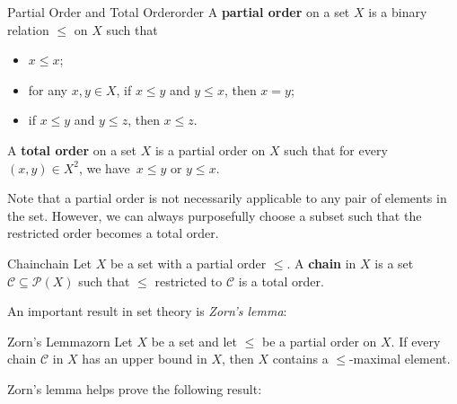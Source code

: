 \documentclass[math]{amznotes}
\theoremstyle{remark}
\begin{document}
\begin{dfnbox}{Partial Order and Total Order}{order}
    A {\color{red} \textbf{partial order}} on a set $X$ is a binary relation $\leq$ on $X$ such that 
    \begin{itemize}
        \item $x \leq x$;
        \item for any $x, y \in X$, if $x \leq y$ and $y \leq x$, then $x = y$;
        \item if $x \leq y$ and $y \leq z$, then $x \leq z$.
    \end{itemize}
    A {\color{red} \textbf{total order}} on a set $X$ is a partial order on $X$ such that for every $\left(x, y\right) \in X^2$, we have~$x \leq y$ or $y \leq x$.
\end{dfnbox}
Note that a partial order is not necessarily applicable to any pair of elements in the set. However, we can always purposefully choose a subset such that the restricted order becomes a total order. 
\begin{dfnbox}{Chain}{chain}
    Let $X$ be a set with a partial order $\leq$. A {\color{red} \textbf{chain}} in $X$ is a set $\mathcal{C} \subseteq \mathcal{P}\left(X\right)$ such that $\leq$ restricted to $\mathcal{C}$ is a total order.
\end{dfnbox}
An important result in set theory is \textit{Zorn's lemma}:
\begin{lembox}{Zorn's Lemma}{zorn}
    Let $X$ be a set and let $\leq$ be a partial order on $X$. If every chain $\mathcal{C}$ in $X$ has an upper bound in $X$, then $X$ contains a $\leq$-maximal element.
\end{lembox}
Zorn's lemma helps prove the following result:
\end{document}
